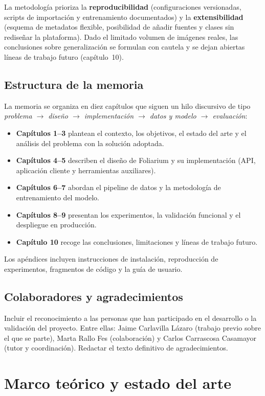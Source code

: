 \documentclass[11pt,spanish,listoffigures,listoftables]{tfgetsinf}
\begin{document}
La metodología prioriza la \textbf{reproducibilidad} (configuraciones versionadas, scripts de importación y entrenamiento documentados) y la \textbf{extensibilidad} (esquema de metadatos flexible, posibilidad de añadir fuentes y clases sin rediseñar la plataforma). Dado el limitado volumen de imágenes reales, las conclusiones sobre generalización se formulan con cautela y se dejan abiertas líneas de trabajo futuro (capítulo~10).

\section{Estructura de la memoria}
La memoria se organiza en diez capítulos que siguen un hilo discursivo de tipo \textit{problema $\rightarrow$ diseño $\rightarrow$ implementación $\rightarrow$ datos y modelo $\rightarrow$ evaluación}:

\begin{itemize}
    \item \textbf{Capítulos 1--3} plantean el contexto, los objetivos, el estado del arte y el análisis del problema con la solución adoptada.
    \item \textbf{Capítulos 4--5} describen el diseño de Foliarium y su implementación (API, aplicación cliente y herramientas auxiliares).
    \item \textbf{Capítulos 6--7} abordan el pipeline de datos y la metodología de entrenamiento del modelo.
    \item \textbf{Capítulos 8--9} presentan los experimentos, la validación funcional y el despliegue en producción.
    \item \textbf{Capítulo 10} recoge las conclusiones, limitaciones y líneas de trabajo futuro.
\end{itemize}

Los apéndices incluyen instrucciones de instalación, reproducción de experimentos, fragmentos de código y la guía de usuario.

\section{Colaboradores y agradecimientos}
Incluir el reconocimiento a las personas que han participado en el desarrollo o la validación del proyecto. Entre ellas: Jaime Carlavilla Lázaro (trabajo previo sobre el que se parte), Marta Rallo Fes (colaboración) y Carlos Carrascosa Casamayor (tutor y coordinación). Redactar el texto definitivo de agradecimientos.

\chapter{Marco teórico y estado del arte}
\end{document}
